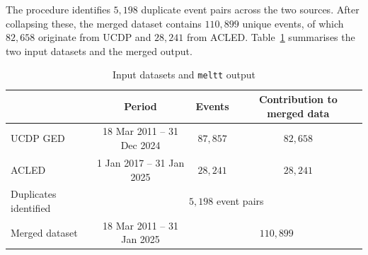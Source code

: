 The procedure identifies $5{,}198$ duplicate event pairs across the two
sources. After collapsing these, the merged dataset contains $110{,}899$ unique
events, of which $82{,}658$ originate from UCDP and $28{,}241$ from ACLED.
Table~\ref{tab:meltt} summarises the two input datasets and the merged output.

\begin{table}[htbp]
\centering
\caption{Input datasets and \texttt{meltt} output}
\label{tab:meltt}
\begin{tabular}{lccc}
\hline\hline
 & Period & Events & Contribution to merged data \\
\hline
UCDP GED  & 18 Mar 2011 -- 31 Dec 2024 & $87{,}857$ & $82{,}658$ \\
ACLED     & 1 Jan 2017 -- 31 Jan 2025  & $28{,}241$ & $28{,}241$ \\
\hline
Duplicates identified & \multicolumn{3}{c}{$5{,}198$ event pairs} \\
Merged dataset        & 18 Mar 2011 -- 31 Jan 2025 & \multicolumn{2}{c}{$110{,}899$} \\
\hline\hline
\end{tabular}
\end{table}

